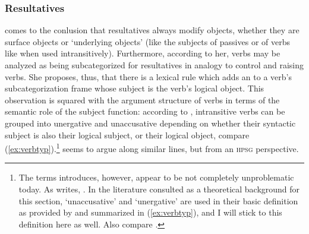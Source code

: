 
\subsubsection{Resultatives}
\label{subsubsec:res}

\citet{simpson1983} comes to the conlusion that resultatives always modify
objects, whether they are surface objects or `underlying objects' (like the
subjects of passives or of verbs like  when used intransitively).
Furthermore, according to her, verbs may be analyzed as being subcategorized
for resultatives in analogy to control and raising verbs. She proposes, thus,
that there is a lexical rule which adds an \XCompl{} to a verb's
subcategorization frame whose subject is the verb's logical object. This
observation is squared with the argument structure of verbs in terms of the
semantic role of the subject function: according to \citet{perlmutter1978},
intransitive verbs can be grouped into unergative and unaccusative depending on
whether their syntactic subject is also their logical subject, or their logical
object, compare (\ref{ex:verbtyp}).\footnote{The terms \citet{perlmutter1978}
introduces, however, appear to be not completely unproblematic today. As
\citet{dixon2010b} writes, . In the literature consulted as
a theoretical background for this section, `unaccusative' and `unergative' are
used in their basic definition as provided by \citet{perlmutter1978} and
summarized in (\ref{ex:verbtyp}), and I will stick to this definition here as
well. Also compare \citet[334--336]{bresnan2016}.} \citet{mueller2002} seems to
argue along similar lines, but from an \textsc{hpsg} perspective.

